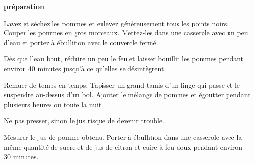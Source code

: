 

\vfill
\newpage
\textbf{{\LARGE préparation}}%

\hrulefill

\vspace*{\fill}
\begin{multicols}{2}

Lavez et séchez les pommes et enlevez généreusement tous les points noirs. Couper les pommes en gros morceaux.\newline 
Mettez-les dans une casserole avec un peu d'eau et portez à ébullition avec le couvercle fermé.\newline

 Dès que l'eau bout, réduire un peu le feu et laisser bouillir les pommes pendant environ 40 minutes jusqu'à ce qu'elles se désintègrent.\newline
 
 Remuer de temps en temps. Tapisser un grand tamis d'un linge qui passe et le suspendre au-dessus d'un bol. Ajouter le mélange de pommes et égoutter pendant plusieurs heures ou toute la nuit. \newline 

Ne pas presser, sinon le jus risque de devenir trouble.\newline


 Mesurer le jus de pomme obtenu. Porter à ébullition dans une casserole avec la même quantité de sucre et de jus de citron et cuire à feu doux pendant environ 30 minutes. \newline
 





\end{multicols}
\vfill
